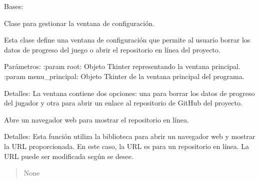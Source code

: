 \documentclass[letterpaper,10pt,spanish]{sphinxmanual}
\begin{document}
\begin{fulllineitems}
\label{\detokenize{configuracion:configuracion.Configuracion}}
\pysigstartsignatures
{}
\pysigstopsignatures
\sphinxAtStartPar
Bases: 

\sphinxAtStartPar
Clase para gestionar la ventana de configuración.

\sphinxAtStartPar
Esta clase define una ventana de configuración que permite al usuario borrar
los datos de progreso del juego o abrir el repositorio en línea del proyecto.

\sphinxAtStartPar
Parámetros:
:param root: Objeto Tkinter representando la ventana principal.
:param menu\_principal: Objeto Tkinter de la ventana principal del programa.

\sphinxAtStartPar
Detalles:
La ventana contiene dos opciones: una para borrar los datos de progreso del jugador
y otra para abrir un enlace al repositorio de GitHub del proyecto.

\begin{fulllineitems}
\label{\detokenize{configuracion:configuracion.Configuracion.abrir_repositorio}}
\pysigstartsignatures
{}
\pysigstopsignatures
\sphinxAtStartPar
Abre un navegador web para mostrar el repositorio en línea.

\sphinxAtStartPar
Detalles:
Esta función utiliza la biblioteca  para abrir un navegador web
y mostrar la URL proporcionada. En este caso, la URL es para un repositorio
en línea. La URL puede ser modificada según se desee.
\begin{quote}\begin{description}
\sphinxAtStartPar
None

\end{description}\end{quote}

\end{fulllineitems}


\end{fulllineitems}
\end{document}
